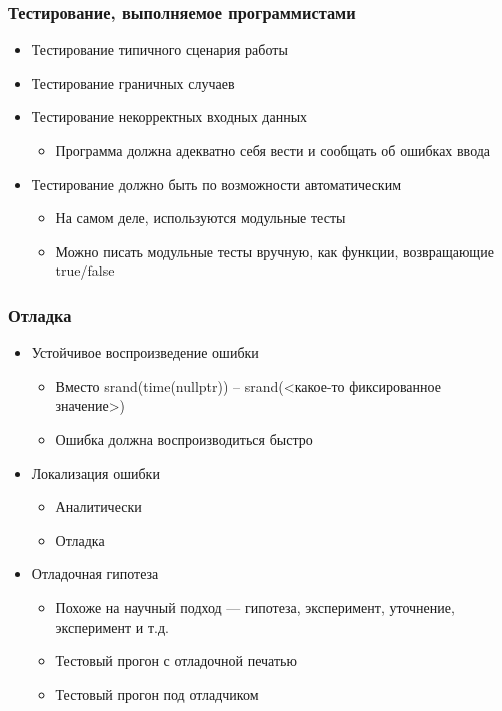 \documentclass[xetex,mathserif,serif]{beamer}
\begin{document}
	\begin{frame}
		\frametitle{Тестирование, выполняемое программистами}
		\begin{itemize}
			\item Тестирование типичного сценария работы
			\item Тестирование граничных случаев
			\item Тестирование некорректных входных данных
			\begin{itemize}
				\item Программа должна адекватно себя вести и сообщать об ошибках ввода
			\end{itemize}
			\item Тестирование должно быть по возможности автоматическим
			\begin{itemize}
				\item На самом деле, используются модульные тесты
				\item Можно писать модульные тесты вручную, как функции, возвращающие true/false
			\end{itemize}	
		\end{itemize}
	\end{frame}
	
	\begin{frame}
		\frametitle{Отладка}
		\begin{itemize}
			\item Устойчивое воспроизведение ошибки
			\begin{itemize}
				\item Вместо srand(time(nullptr)) – srand(<какое-то фиксированное значение>)
				\item Ошибка должна воспроизводиться быстро
			\end{itemize}
			\item Локализация ошибки
			\begin{itemize}
				\item Аналитически
				\item Отладка
			\end{itemize}
			\item Отладочная гипотеза
			\begin{itemize}
				\item Похоже на научный подход --- гипотеза, эксперимент, уточнение, эксперимент и т.д.
				\item Тестовый прогон с отладочной печатью
				\item Тестовый прогон под отладчиком
			\end{itemize}	
		\end{itemize}
	\end{frame}
\end{document}
